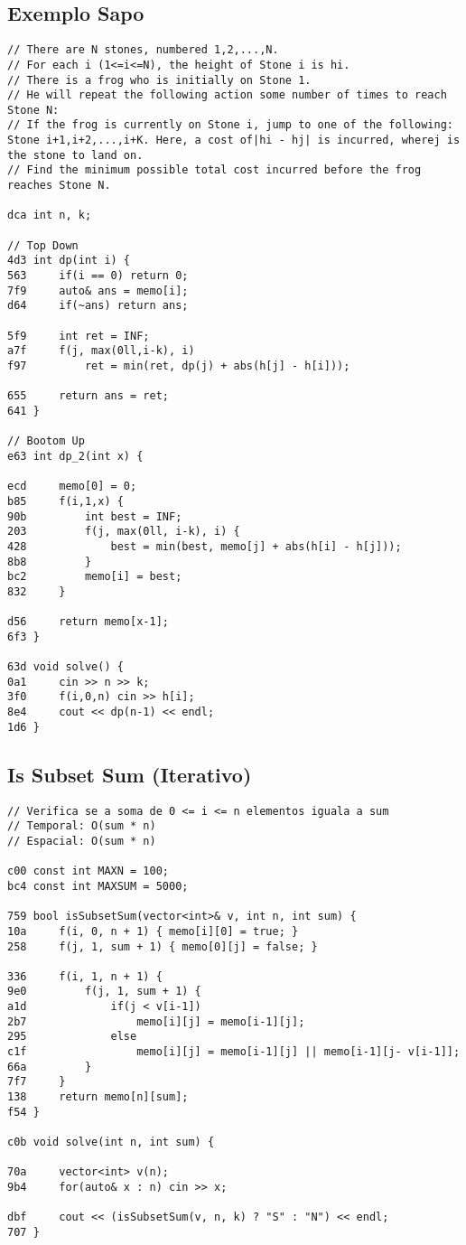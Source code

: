 \documentclass[11pt, a4paper, twoside]{article}
\begin{document}
\subsection{Exemplo Sapo}
\begin{lstlisting}
// There are N stones, numbered 1,2,...,N. 
// For each i (1<=i<=N), the height of Stone i is hi.
// There is a frog who is initially on Stone 1. 
// He will repeat the following action some number of times to reach Stone N:
// If the frog is currently on Stone i, jump to one of the following: Stone i+1,i+2,...,i+K. Here, a cost of|hi - hj| is incurred, wherej is the stone to land on.
// Find the minimum possible total cost incurred before the frog reaches Stone N.

dca int n, k;

// Top Down
4d3 int dp(int i) {
563 	if(i == 0) return 0;
7f9 	auto& ans = memo[i];
d64 	if(~ans) return ans;
    
5f9 	int ret = INF;
a7f 	f(j, max(0ll,i-k), i)
f97 		ret = min(ret, dp(j) + abs(h[j] - h[i]));
    
655 	return ans = ret;
641 }

// Bootom Up
e63 int dp_2(int x) {
    	
ecd 	memo[0] = 0;
b85 	f(i,1,x) {
90b 		int best = INF;
203 		f(j, max(0ll, i-k), i) {
428 			best = min(best, memo[j] + abs(h[i] - h[j]));
8b8 		}
bc2 		memo[i] = best;
832 	}
    
d56 	return memo[x-1];
6f3 }

63d void solve() {
0a1 	cin >> n >> k;
3f0 	f(i,0,n) cin >> h[i];
8e4 	cout << dp(n-1) << endl;
1d6 }
\end{lstlisting}

\subsection{Is Subset Sum (Iterativo)}
\begin{lstlisting}
// Verifica se a soma de 0 <= i <= n elementos iguala a sum
// Temporal: O(sum * n)
// Espacial: O(sum * n)

c00 const int MAXN = 100;
bc4 const int MAXSUM = 5000;

759 bool isSubsetSum(vector<int>& v, int n, int sum) {
10a     f(i, 0, n + 1) { memo[i][0] = true; }
258     f(j, 1, sum + 1) { memo[0][j] = false; }
        
336     f(i, 1, n + 1) {
9e0         f(j, 1, sum + 1) {
a1d             if(j < v[i-1])
2b7                 memo[i][j] = memo[i-1][j];
295             else
c1f                 memo[i][j] = memo[i-1][j] || memo[i-1][j- v[i-1]];
66a         }
7f7     }
138     return memo[n][sum];
f54 }

c0b void solve(int n, int sum) {
        
70a     vector<int> v(n);
9b4 	for(auto& x : n) cin >> x;
        
dbf     cout << (isSubsetSum(v, n, k) ? "S" : "N") << endl;
707 }

\end{lstlisting}
\end{document}
